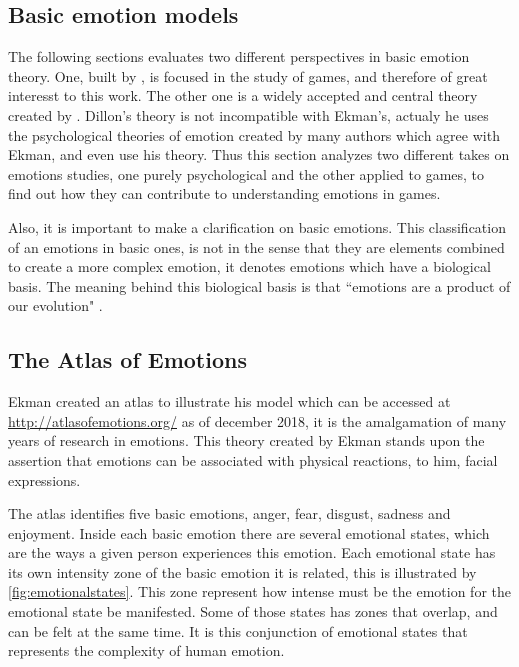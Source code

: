 \subsection{Basic emotion models}

The following sections evaluates two different perspectives in basic emotion theory. One, built by \cite{dillon_way_2010}, is focused in the study of games, and therefore of great interesst to this work. The other one is a widely accepted and central theory created by \cite{ekman_are_basic_emotions_nodate}. Dillon's theory is not incompatible with Ekman's, actualy he uses the psychological theories of emotion created by many authors which agree with Ekman, and even use his theory. Thus this section analyzes two different takes on emotions studies, one purely psychological and the other applied to games, to find out how they can contribute to understanding emotions in games.

Also, it is important to make a clarification on basic emotions. This classification of an emotions in basic ones, is not in the sense that they are elements combined to create a more complex emotion, it denotes emotions which have a biological basis. The meaning behind this biological basis is that ``emotions are a product of our evolution" \cite{ekman_are_basic_emotions_nodate}. 

\subsection{The Atlas of Emotions}

Ekman created an atlas to illustrate his model which can be accessed at \url{http://atlasofemotions.org/} as of december 2018, it is the amalgamation of many years of research in emotions. This theory created by Ekman stands upon the assertion that emotions can be associated with physical reactions, to him, facial expressions.

The atlas identifies five basic emotions, anger, fear, disgust, sadness and enjoyment. Inside each basic emotion there are several emotional states, which are the ways a given person experiences this emotion. Each emotional state has its own intensity zone of the basic emotion it is related, this is illustrated by \autoref{fig:emotionalstates}. This zone represent how intense must be the emotion for the emotional state be manifested. Some of those states has zones that overlap, and can be felt at the same time. It is this conjunction of emotional states that represents the complexity of human emotion.


